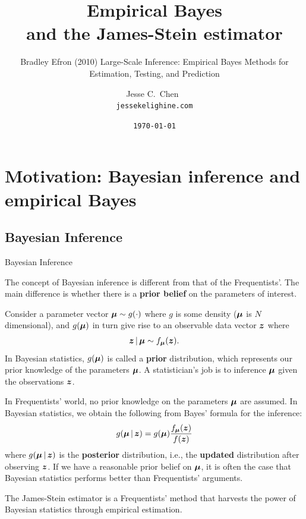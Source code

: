 \documentclass{beamer}
\title{\textbf{Empirical Bayes\\and the James-Stein estimator}}
\subtitle{Bradley Efron (2010) Large-Scale Inference: Empirical Bayes Methods for Estimation, Testing, and Prediction}
\author{Jesse C.\ Chen\ \\\texttt{jessekelighine.com}}
\date{\texttt{\today}}
\begin{document}
\begin{frame}
	\maketitle
\end{frame}

\begin{frame}
	\tableofcontents
\end{frame}

\section{Motivation: Bayesian inference and empirical Bayes}

\subsection{Bayesian Inference}

\begin{frame}{Bayesian Inference}
	\begin{block}{}
		The concept of Bayesian inference is different from that of the
		Frequentists'.  The main difference is whether there is a
		\textbf{prior belief} on the parameters of interest.
	\end{block}
	Consider a parameter vector $\boldsymbol{\mu}\sim g(\cdot)$ where $g$ is some density
	($\boldsymbol{\mu}$ is $N$ dimensional),
	and $g(\boldsymbol{\mu})$ in turn give rise to an observable data vector $\boldsymbol{z}$ where
	\begin{align*}
		\boldsymbol{z}\,|\,\boldsymbol{\mu} \sim f_{\boldsymbol{\mu}}(\boldsymbol{z}).
	\end{align*}
	In Bayesian statistics, $g(\boldsymbol{\mu})$ is called a \textbf{prior} distribution,
	which represents our prior knowledge of the parameters $\boldsymbol{\mu}$.
	A statistician's job is to inference $\boldsymbol{\mu}$ given the observations $\boldsymbol{z}$.
\end{frame}

\begin{frame}{}
	In Frequentists' world,
	no prior knowledge on the parameters $\boldsymbol{\mu}$ are assumed.
	In Bayesian statistics, we obtain the following from Bayes' formula
	for the inference:
	\begin{align*}
		g(\boldsymbol{\mu}\,|\, \boldsymbol{z}) = g(\boldsymbol{\mu}) \frac{f_{\boldsymbol{\mu}}(\boldsymbol{z})}{f(\boldsymbol{z})}
	\end{align*}
	where $g(\boldsymbol{\mu}\,|\, \boldsymbol{z})$ is the \textbf{posterior} distribution, i.e.,
	the \textbf{updated} distribution after observing $\boldsymbol{z}$.
	If we have a reasonable prior belief on $\boldsymbol{\mu}$,
	it is often the case that Bayesian statistics performs better than
	Frequentists' arguments.
	\begin{block}{}
		The James-Stein estimator
		is a Frequentists' method that harvests the power of Bayesian
		statistics through empirical estimation.
	\end{block}
\end{frame}
\end{document}
